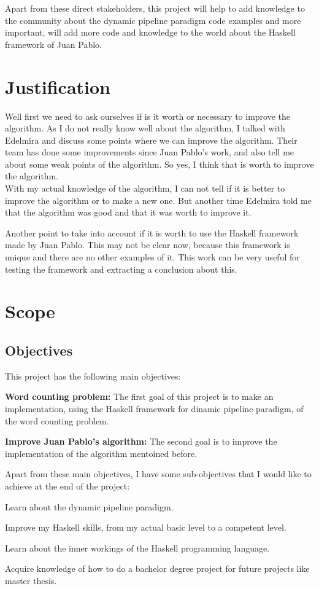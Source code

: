 Apart from these direct stakeholders, this project will help to add knowledge to the community about the dynamic pipeline paradigm code examples and more important, will add more code and knowledge to the world about the Haskell framework of Juan Pablo.

\chapter{Justification}
Well first we need to ask ourselves if is it worth or necessary to improve the algorithm.
As I do not really know well about the algorithm, I talked with Edelmira and discuss some points where we can improve the algorithm.
Their team has done some improvements since Juan Pablo's work, and also tell me about some weak points of the algorithm.
So yes, I think that is worth to improve the algorithm.\\

With my actual knowledge of the algorithm, I can not tell if it is better to improve the algorithm or to make a new one.
But another time Edelmira told me that the algorithm was good and that it was worth to improve it.

Another point to take into account if it is worth to use the Haskell framework made by Juan Pablo.
This may not be clear now, because this framework is unique and there are no other examples of it.
This work can be very useful for testing the framework and extracting a conclusion about this.

\chapter{Scope}
\section{Objectives}
This project has the following main objectives:
\begin{list}{-}{}
    \item \textbf{Word counting problem:} The first goal of this project is to make an implementation, using the Haskell framework for dinamic pipeline paradigm, of the word counting problem. 
    \item \textbf{Improve Juan Pablo's algorithm:} The second goal is to improve the implementation of the algorithm mentoined before.
\end{list}
Apart from these main objectives, I have some sub-objectives that I would like to achieve at the end of the project:
\begin{list}{-}{}
    \item Learn about the dynamic pipeline paradigm.
    \item Improve my Haskell skills, from my actual basic level to a competent level.
    \item Learn about the inner workings of the Haskell programming language.
    \item Acquire knowledge of how to do a bachelor degree project for future projects like master thesis.
\end{list}
